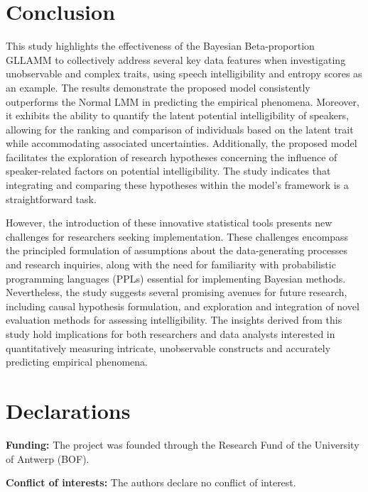 \documentclass[
  authoryear,
  preprint,
  1p]{elsarticle}
\begin{document}
\section{Conclusion}\label{sec-conclusion}

This study highlights the effectiveness of the Bayesian Beta-proportion
GLLAMM to collectively address several key data features when
investigating unobservable and complex traits, using speech
intelligibility and entropy scores as an example. The results
demonstrate the proposed model consistently outperforms the Normal LMM
in predicting the empirical phenomena. Moreover, it exhibits the ability
to quantify the latent potential intelligibility of speakers, allowing
for the ranking and comparison of individuals based on the latent trait
while accommodating associated uncertainties. {Additionally, the
proposed model facilitates the exploration of research hypotheses
concerning the influence of speaker-related factors on potential
intelligibility. The study indicates that integrating and comparing
these hypotheses within the model's framework is a straightforward
task.}

However, the introduction of these innovative statistical tools presents
new challenges for researchers seeking implementation. These challenges
encompass the principled formulation of assumptions about the
data-generating processes and research inquiries, along with the need
for familiarity with probabilistic programming languages (PPLs)
essential for implementing Bayesian methods. {Nevertheless, the study
suggests several promising avenues for future research, including causal
hypothesis formulation, and exploration and integration of novel
evaluation methods for assessing intelligibility. The insights derived
from this study hold implications for both researchers and data analysts
interested in quantitatively measuring intricate, unobservable
constructs and accurately predicting empirical phenomena.}

\newpage{}

\section*{Declarations}\label{declarations}

\textbf{Funding:} The project was founded through the Research Fund of
the University of Antwerp (BOF).

\textbf{Conflict of interests:} The authors declare no conflict of
interest.
\end{document}
